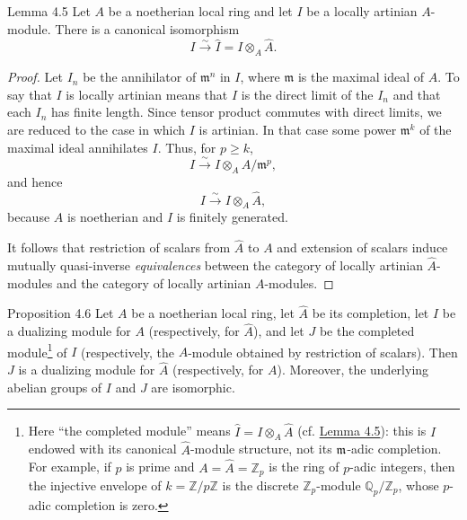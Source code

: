 \begin{sgastatement}{Lemma 4.5}
Let $A$ be a noetherian local ring and let $I$ be a locally artinian
$A$-module. There is a canonical isomorphism
\[
  I\xrightarrow{\sim}\widehat I=I\otimes_A\widehat A.
\]
\end{sgastatement}

\begin{proof}
Let $I_n$ be the annihilator of $\mathfrak m^n$ in $I$, where
$\mathfrak m$ is the maximal ideal of $A$. To say that $I$ is locally
artinian means that $I$ is the direct limit of the $I_n$ and that each
$I_n$ has finite length. Since tensor product commutes with direct
limits, we are reduced to the case in which $I$ is artinian. In that
case some power $\mathfrak m^k$ of the maximal ideal annihilates $I$.
Thus, for $p\geq k$,
\[
  I\xrightarrow{\sim}I\otimes_A A/\mathfrak m^p,
\]
and hence
\[
  I\xrightarrow{\sim}I\otimes_A\widehat A,
\]
because $A$ is noetherian and $I$ is finitely generated.

It follows that restriction of scalars from $\widehat A$ to
$A$ and extension of scalars induce mutually quasi-inverse
\emph{equivalences} between the category of locally artinian
$\widehat A$-modules and the category of locally artinian $A$-modules.
\end{proof}


\begin{sgastatement}{Proposition 4.6}
Let $A$ be a noetherian local ring, let $\widehat A$ be its completion,
let $I$ be a dualizing module for $A$ (respectively, for $\widehat A$), and
let $J$ be the completed module\footnote{Here ``the completed module'' means
$\widehat I=I\otimes_A\widehat A$ (cf. \hyperref[IV.4.5]{Lemma 4.5}): this is $I$ endowed with
its canonical $\widehat A$-module structure, not its $\mathfrak m$-adic
completion. For example, if $p$ is prime and
$A=\widehat A=\mathbb Z_p$ is the ring of $p$-adic integers, then the injective envelope of
$k=\mathbb Z/p\mathbb Z$ is the discrete $\mathbb Z_p$-module
$\mathbb Q_p/\mathbb Z_p$, whose $p$-adic completion is zero.}
of $I$ (respectively, the $A$-module obtained by restriction of scalars).
Then $J$ is a dualizing module for $\widehat A$ (respectively, for $A$).
Moreover, the underlying abelian groups of $I$ and $J$ are isomorphic.
\end{sgastatement}

